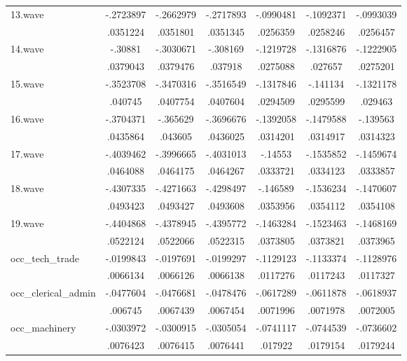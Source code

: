 {\begin{tabular}{l*{6}{c}}
13.wave     &   -.2723897&   -.2662979&   -.2717893&   -.0990481&   -.1092371&   -.0993039\\
            &    .0351224&    .0351801&    .0351345&    .0256359&    .0258246&    .0256457\\
14.wave     &     -.30881&   -.3030671&    -.308169&   -.1219728&   -.1316876&   -.1222905\\
            &    .0379043&    .0379476&     .037918&    .0275088&     .027657&    .0275201\\
15.wave     &   -.3523708&   -.3470316&   -.3516549&   -.1317846&    -.141134&   -.1321178\\
            &     .040745&    .0407754&    .0407604&    .0294509&    .0295599&     .029463\\
16.wave     &   -.3704371&    -.365629&   -.3696676&   -.1392058&   -.1479588&    -.139563\\
            &    .0435864&     .043605&    .0436025&    .0314201&    .0314917&    .0314323\\
17.wave     &   -.4039462&   -.3996665&   -.4031013&     -.14553&   -.1535852&   -.1459674\\
            &    .0464088&    .0464175&    .0464267&    .0333721&    .0334123&    .0333857\\
18.wave     &   -.4307335&   -.4271663&   -.4298497&    -.146589&   -.1536234&   -.1470607\\
            &    .0493423&    .0493427&    .0493608&    .0353956&    .0354112&    .0354108\\
19.wave     &   -.4404868&   -.4378945&   -.4395772&   -.1463284&   -.1523463&   -.1468169\\
            &    .0522124&    .0522066&    .0522315&    .0373805&    .0373821&    .0373965\\
occ\_tech\_trade&   -.0199843&   -.0197691&   -.0199297&   -.1129123&   -.1133374&   -.1128976\\
            &    .0066134&    .0066126&    .0066138&    .0117276&    .0117243&    .0117327\\
occ\_clerical\_admin&   -.0477604&   -.0476681&   -.0478476&   -.0617289&   -.0611878&   -.0618937\\
            &     .006745&    .0067439&    .0067454&    .0071996&    .0071978&    .0072005\\
occ\_machinery&   -.0303972&   -.0300915&   -.0305054&   -.0741117&   -.0744539&   -.0736602\\
            &    .0076423&    .0076415&    .0076441&     .017922&    .0179154&    .0179244\\

\end{tabular}}
